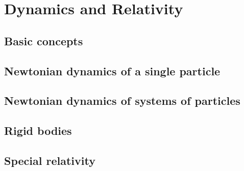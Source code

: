 \documentclass[main.tex]{subfiles}
\begin{document}
\chapter{Dynamics and Relativity}
	\section{Basic concepts}
	
	\section{Newtonian dynamics of a single particle}
	
	\section{Newtonian dynamics of systems of particles}
	
	\section{Rigid bodies}
	
	\section{Special relativity}
\end{document}
